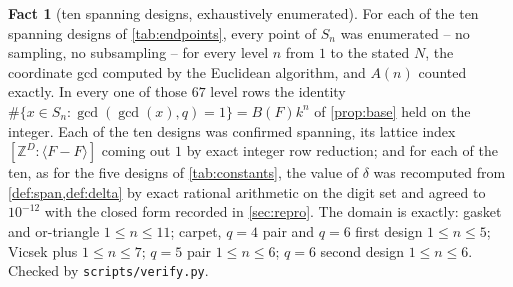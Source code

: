 \documentclass[11pt]{amsart}
\theoremstyle{definition}
\newtheorem{fact}[theorem]{Fact}
\theoremstyle{remark}
\begin{document}
\begin{fact}[ten spanning designs, exhaustively enumerated]
\label{fact:census}
For each of the ten spanning designs of \cref{tab:endpoints}, every point of $S_n$ was enumerated -- no sampling, no subsampling -- for every level $n$ from $1$ to the stated $N$, the coordinate gcd computed by the Euclidean algorithm, and $A(n)$ counted exactly. In every one of those $67$ level rows the identity $\#\{x \in S_n : \gcd(\gcd(x),q)=1\} = B(F)k^{n}$ of \cref{prop:base} held on the integer. Each of the ten designs was confirmed spanning, its lattice index $[\mathbb{Z}^{D}:\langle F-F\rangle]$ coming out $1$ by exact integer row reduction; and for each of the ten, as for the five designs of \cref{tab:constants}, the value of $\delta$ was recomputed from \cref{def:span,def:delta} by exact rational arithmetic on the digit set and agreed to $10^{-12}$ with the closed form recorded in \cref{sec:repro}. The domain is exactly: gasket and or-triangle $1 \le n \le 11$; carpet, $q=4$ pair and $q=6$ first design $1 \le n \le 5$; Vicsek plus $1 \le n \le 7$; $q=5$ pair $1 \le n \le 6$; $q=6$ second design $1 \le n \le 6$. Checked by \texttt{scripts/verify.py}.
\end{fact}
\end{document}
